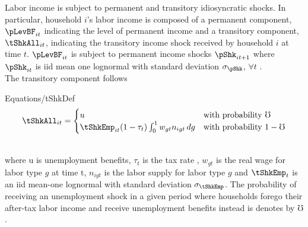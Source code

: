 \documentclass[titlepage]{\econtex}\providecommand{\texname}{BufferStockTheory}
\providecommand{\EqDir}{Equations}
\begin{document}
Labor income is subject to permanent and transitory idiosyncratic shocks. In particular, household $i$'s labor income is composed of a permanent component, $\pLevBF_{it} $ indicating the level of permanent income and a transitory component, $\tShkAll_{it} $, indicating the transitory income shock received by household $i$ at time $t$. $\pLevBF_{it} $ is subject to permanent income shocks $\pShk_{it+1}$ where $\pShk_{it}$ is iid mean one lognormal with standard deviation $\sigma_\pShk$, $\forall t$ . \\



The transitory component follows   \\
\begin{verbatimwrite}{\EqDir/tShkDef}
\begin{equation}
\tShkAll _{it}=
\begin{cases}
 u \phantom{_{t+1}/\pNotZero} & \text{with probability $\mho $} \\
 \tShkEmp_{it} (1-\tau_{t})\int_{0}^{1} w_{gt}n_{igt} \, dg      & \text{with probability $1 - \mho  $} 
\end{cases} \label{eq:tShkDef}
\end{equation}
\end{verbatimwrite}
\\
where u is unemployment benefits, $\tau_{t}$ is the tax rate , $w_{gt}$ is the real wage for labor type $g$ at time t, $ n_{igt}$ is the labor supply for labor type $g$ and $\tShkEmp_{t}$ is an iid mean-one lognormal with standard deviation $\sigma_{\tShkEmp}$.  The probability of receiving an unemployment shock in a given period where households forego their after-tax labor income and receive unemployment benefits instead is denotes by $\mho$.  \\ 



\begin{comment}
Combining the transition equations, the recursive nature of
the problem allows us to rewrite it more compactly in Bellman equation form,
\begin{eqnarray*}
\VFunc_{t}(\mLevBF_{t},\pLevBF_{t}) & = & \max_{\cLevBF_{t}}~\left\{\util(\cLevBF_{t})+\DiscFac \Ex_{t}\left[ \VFunc_{t+1}((\mLevBF_{t}-\cLevBF_{t})\Rfree+ \pLevBF_{t+1}\tShkAll_{t+1},\pLevBF_{t} \PGro  \pShk_{t+1})\right]\right\}
.
\end{eqnarray*}
\end{comment} 

\hypertarget{Financial Intermediary}{}
\end{document}
